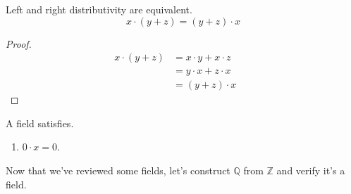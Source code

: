 \documentclass{article}
\begin{document}
      \begin{lemma}[Left = Right Distributivity]
        Left and right distributivity are equivalent. 
        \begin{equation}
          x \cdot (y + z) = (y + z) \cdot x
        \end{equation}
      \end{lemma} 
      \begin{proof}
        \begin{align}
          x \cdot (y + z) & = x \cdot y + x \cdot z && \tag{Distributive} \\
                          & = y \cdot x + z \cdot x && \tag{Commutative} \\
                          & = (y + z) \cdot x && \tag{Distributive} 
        \end{align}
      \end{proof} 

      \begin{lemma}[Operations]
        A field satisfies. 
        \begin{enumerate}
          \item $0 \cdot x = 0$.  
        \end{enumerate}
      \end{lemma}

      Now that we've reviewed some fields, let's construct $\mathbb{Q}$ from $\mathbb{Z}$ and verify it's a field. 
\end{document}
